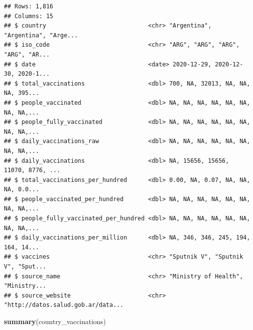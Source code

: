 \documentclass[
]{book}
\newenvironment{Shaded}{\begin{snugshade}}{\end{snugshade}}
\newcommand{\KeywordTok}[1]{\textcolor[rgb]{0.13,0.29,0.53}{\textbf{#1}}}
\newcommand{\NormalTok}[1]{#1}
\begin{document}
\begin{verbatim}
## Rows: 1,816
## Columns: 15
## $ country                             <chr> "Argentina", "Argentina", "Arge...
## $ iso_code                            <chr> "ARG", "ARG", "ARG", "ARG", "AR...
## $ date                                <date> 2020-12-29, 2020-12-30, 2020-1...
## $ total_vaccinations                  <dbl> 700, NA, 32013, NA, NA, NA, 395...
## $ people_vaccinated                   <dbl> NA, NA, NA, NA, NA, NA, NA, NA,...
## $ people_fully_vaccinated             <dbl> NA, NA, NA, NA, NA, NA, NA, NA,...
## $ daily_vaccinations_raw              <dbl> NA, NA, NA, NA, NA, NA, NA, NA,...
## $ daily_vaccinations                  <dbl> NA, 15656, 15656, 11070, 8776, ...
## $ total_vaccinations_per_hundred      <dbl> 0.00, NA, 0.07, NA, NA, NA, 0.0...
## $ people_vaccinated_per_hundred       <dbl> NA, NA, NA, NA, NA, NA, NA, NA,...
## $ people_fully_vaccinated_per_hundred <dbl> NA, NA, NA, NA, NA, NA, NA, NA,...
## $ daily_vaccinations_per_million      <dbl> NA, 346, 346, 245, 194, 164, 14...
## $ vaccines                            <chr> "Sputnik V", "Sputnik V", "Sput...
## $ source_name                         <chr> "Ministry of Health", "Ministry...
## $ source_website                      <chr> "http://datos.salud.gob.ar/data...
\end{verbatim}

\begin{Shaded}
\begin{Highlighting}[]
\KeywordTok{summary}\NormalTok{(country_vaccinations)}
\end{Highlighting}
\end{Shaded}
\end{document}
